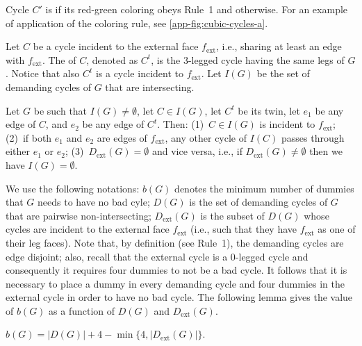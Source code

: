 \documentclass[runningheads]{llncs}
\newcommand{\ext}{\operatorname{ext}}
\let\emph\relax\DeclareTextFontCommand{\emph}{\color{dark blue}\em}
\begin{document}
\smallskip

Cycle $C'$ is \emph{demanding} if its red-green coloring obeys Rule~1 and \emph{non-demanding} otherwise. For an example of application of the coloring rule, see \cref{app-fig:cubic-cycles-a}.


Let $C$ be a cycle incident to the external face $f_{\ext}$, i.e., sharing at least an edge with $f_{\ext}$. The \emph{twin} of $C$, denoted as $C^t$, is the 3-legged cycle having the same legs of $G$. Notice that also $C^t$ is a cycle incident to $f_{\ext}$. Let $I(G)$ be the set of demanding cycles of $G$ that are intersecting.


\begin{lemma}
\label{app-le:cubic-only_intersecting}
Let $G$ be such that $I(G)\not= \emptyset$, let $C\in I(G)$, let $C^t$ be its twin,  let $e_1$ be any edge of $C$, and $e_2$ be any edge of $C^t$. Then: (1)~$C\in I(G)$ is incident to $f_{\ext}$; (2)~if both $e_1$ and $e_2$ are edges of $f_{\ext}$, any other cycle of $I(C)$ passes through either $e_1$ or $e_2$; (3)~$D_{\ext}(G)=\emptyset$ and vice versa, i.e., if $D_{\ext}(G)\not =\emptyset$ then we have $I(G)= \emptyset$.
\end{lemma}


We use the following notations: $b(G)$ denotes the minimum number of dummies that $G$ needs to have no bad cyle;  $D(G)$ is the set of demanding cycles of $G$ that are pairwise non-intersecting; $D_{\ext}(G)$ is the subset of $D(G)$ whose cycles are incident to the external face $f_{\ext}$ (i.e., such that they have $f_{\ext}$ as one of their leg faces). 
Note that, by definition (see Rule~1), the demanding cycles are edge disjoint; also, recall that the external cycle is a 0-legged cycle and consequently it requires four dummies to not be a bad cycle. It follows that it is necessary to place a dummy in every demanding cycle and four dummies in the external cycle in order to have no bad cycle. 
The following lemma gives the value of $b(G)$ as a function of $D(G)$ and $D_{\ext}(G)$.

\begin{lemma}
\label{app-le:cubic-fixemb-bends}
$b(G)= |D(G)|+4-\min\{4, |D_{\ext}(G)|\}$.
\end{lemma}
\end{document}
